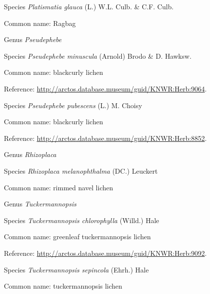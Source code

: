 \documentclass[9pt, article]{memoir}
\begin{document}
\begin{multicols}{2}
\vspace{6pt}\noindent\hspace{36pt}Species \textit{Platismatia glauca} (L.) W.L. Culb. \& C.F. Culb.


Common name: Ragbag

\vspace{6pt}\noindent\hspace{30pt}Genus \textit{Pseudephebe}


\vspace{6pt}\noindent\hspace{36pt}Species \textit{Pseudephebe minuscula} (Arnold) Brodo \& D. Hawksw.


Common name: blackcurly lichen

Reference: 
\url{http://arctos.database.museum/guid/KNWR:Herb:9064}.

\vspace{6pt}\noindent\hspace{36pt}Species \textit{Pseudephebe pubescens} (L.) M. Choisy


Common name: blackcurly lichen

Reference: 
\url{http://arctos.database.museum/guid/KNWR:Herb:8852}.

\vspace{6pt}\noindent\hspace{30pt}Genus \textit{Rhizoplaca}


\vspace{6pt}\noindent\hspace{36pt}Species \textit{Rhizoplaca melanophthalma} (DC.) Leuckert


Common name: rimmed navel lichen

\vspace{6pt}\noindent\hspace{30pt}Genus \textit{Tuckermannopsis}


\vspace{6pt}\noindent\hspace{36pt}Species \textit{Tuckermannopsis chlorophylla} (Willd.) Hale


Common name: greenleaf tuckermannopsis lichen

Reference: 
\url{http://arctos.database.museum/guid/KNWR:Herb:9092}.

\vspace{6pt}\noindent\hspace{36pt}Species \textit{Tuckermannopsis sepincola} (Ehrh.) Hale


Common name: tuckermannopsis lichen


\end{multicols}
\end{document}
